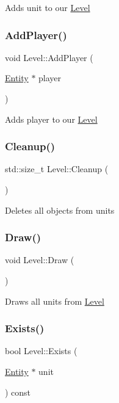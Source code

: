 Adds unit to our \mbox{\hyperlink{class_level}{Level}} \mbox{\label{class_level_a72720ce01a5cd1774f66520ffa33128e}} 
\subsubsection{\texorpdfstring{AddPlayer()}{AddPlayer()}}
{\footnotesize\ttfamily void Level\+::\+Add\+Player (\begin{DoxyParamCaption}\item[{\mbox{\hyperlink{class_entity}{Entity}} $\ast$}]{player }\end{DoxyParamCaption})\hspace{0.3cm}{\ttfamily [inline]}}

Adds player to our \mbox{\hyperlink{class_level}{Level}} \mbox{\label{class_level_a61e1568c2c8677cb735f58a4808e485c}} 
\subsubsection{\texorpdfstring{Cleanup()}{Cleanup()}}
{\footnotesize\ttfamily std\+::size\+\_\+t Level\+::\+Cleanup (\begin{DoxyParamCaption}{ }\end{DoxyParamCaption})}

Deletes all objects from units \mbox{\label{class_level_adcfeec8d835d60b02018308dffa7cfd7}} 
\subsubsection{\texorpdfstring{Draw()}{Draw()}}
{\footnotesize\ttfamily void Level\+::\+Draw (\begin{DoxyParamCaption}{ }\end{DoxyParamCaption})}

Draws all units from \mbox{\hyperlink{class_level}{Level}} \mbox{\label{class_level_a196a92ceea866e88e829ebf589e76589}} 
\subsubsection{\texorpdfstring{Exists()}{Exists()}}
{\footnotesize\ttfamily bool Level\+::\+Exists (\begin{DoxyParamCaption}\item[{\mbox{\hyperlink{class_entity}{Entity}} $\ast$}]{unit }\end{DoxyParamCaption}) const}

